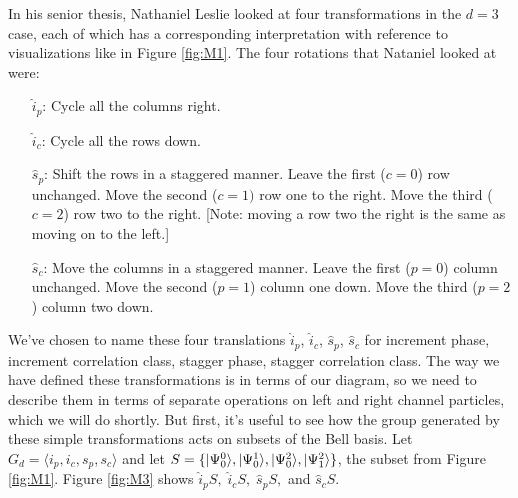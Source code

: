 In his senior thesis, Nathaniel Leslie looked at four transformations in the $d = 3$ case, each of which has a corresponding interpretation with reference to visualizations like in Figure \ref{fig:M1}. The four rotations that Nataniel looked at were:

\begin{enumerate}
  \item[$\hat{i}_p$:] Cycle all the columns right.
  \item[$\hat{i}_c$:] Cycle all the rows down.
  \item[$\hat{s}_p$:] Shift the rows in a staggered manner. Leave the first ($c = 0$) row unchanged. Move the second ($c = 1)$ row one to the right. Move the third ($c = 2$) row two to the right. [Note: moving a row two the right is the same as moving on to the left.]
  \item[$\hat{s}_c$:] Move the columns in a staggered manner. Leave the first ($p = 0$) column unchanged. Move the second ($p = 1$) column one down. Move the third ($p = 2$) column two down.
\end{enumerate}

We've chosen to name these four translations $\hat{i}_p$, $\hat{i}_c$, $\hat{s}_p$, $\hat{s}_c$ for increment phase, increment correlation class, stagger phase, stagger correlation class. The way we have defined these transformations is in terms of our diagram, so we need to describe them in terms of separate operations on left and right channel particles, which we will do shortly. But first, it's useful to see how the group generated by these simple transformations acts on subsets of the Bell basis. Let $G_d = \langle i_p, i_c, s_p, s_c \rangle$ and let $S = \{| \Psi_0^0 \rangle, | \Psi_0^1 \rangle, | \Psi_0^2 \rangle, | \Psi_1^2 \rangle\}$, the subset from Figure \ref{fig:M1}. Figure \ref{fig:M3} shows $\hat{i}_p S,\; \hat{i}_c S,\; \hat{s}_p S,$ and $\hat{s}_c S$.

